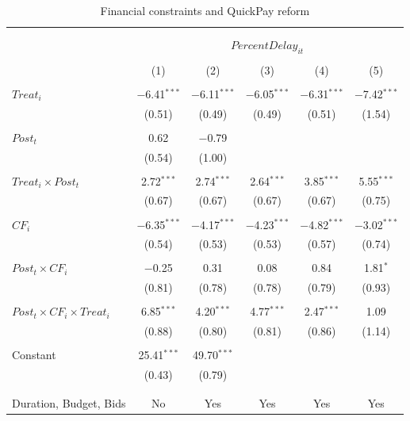 \documentclass[
]{article}
\begin{document}
\begin{table}[H] \centering 
  \caption{Financial constraints and QuickPay reform} 
  \label{} 
\small 
\begin{tabular}{@{\extracolsep{-2pt}}lccccc} 
\\[-1.8ex]\hline 
\hline \\[-1.8ex] 
\\[-1.8ex] & \multicolumn{5}{c}{$PercentDelay_{it}$  } \\ 
\\[-1.8ex] & (1) & (2) & (3) & (4) & (5)\\ 
\hline \\[-1.8ex] 
 $Treat_i$ & $-$6.41$^{***}$ & $-$6.11$^{***}$ & $-$6.05$^{***}$ & $-$6.31$^{***}$ & $-$7.42$^{***}$ \\ 
  & (0.51) & (0.49) & (0.49) & (0.51) & (1.54) \\ 
  & & & & & \\ 
 $Post_t$ & 0.62 & $-$0.79 &  &  &  \\ 
  & (0.54) & (1.00) &  &  &  \\ 
  & & & & & \\ 
 $Treat_i \times Post_t$ & 2.72$^{***}$ & 2.74$^{***}$ & 2.64$^{***}$ & 3.85$^{***}$ & 5.55$^{***}$ \\ 
  & (0.67) & (0.67) & (0.67) & (0.67) & (0.75) \\ 
  & & & & & \\ 
 $CF_i$ & $-$6.35$^{***}$ & $-$4.17$^{***}$ & $-$4.23$^{***}$ & $-$4.82$^{***}$ & $-$3.02$^{***}$ \\ 
  & (0.54) & (0.53) & (0.53) & (0.57) & (0.74) \\ 
  & & & & & \\ 
 $Post_t \times CF_i$ & $-$0.25 & 0.31 & 0.08 & 0.84 & 1.81$^{*}$ \\ 
  & (0.81) & (0.78) & (0.78) & (0.79) & (0.93) \\ 
  & & & & & \\ 
 $Post_t \times CF_i \times Treat_i$ & 6.85$^{***}$ & 4.20$^{***}$ & 4.77$^{***}$ & 2.47$^{***}$ & 1.09 \\ 
  & (0.88) & (0.80) & (0.81) & (0.86) & (1.14) \\ 
  & & & & & \\ 
 Constant & 25.41$^{***}$ & 49.70$^{***}$ &  &  &  \\ 
  & (0.43) & (0.79) &  &  &  \\ 
  & & & & & \\ 
\hline \\[-1.8ex] 
Duration, Budget, Bids & No & Yes & Yes & Yes & Yes \\ 

\end{tabular}
\end{table}
\end{document}
